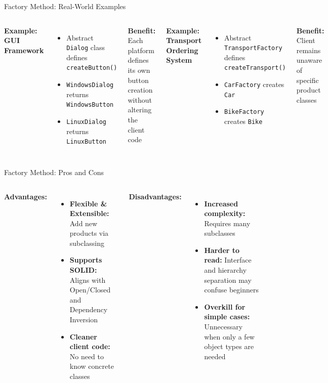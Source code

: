 \documentclass[aspectratio=169, table]{beamer}
\begin{document}
\begin{frame}[fragile]{Factory Method: Real-World Examples}
\vspace{10pt}
\begin{columns}[T]
\textbf{Example: GUI Framework}
\begin{itemize}
\item Abstract \texttt{Dialog} class defines \texttt{createButton()}
\item \texttt{WindowsDialog} returns \texttt{WindowsButton}
\item \texttt{LinuxDialog} returns \texttt{LinuxButton}
\end{itemize}

\textbf{Benefit:}
Each platform defines its own button creation without altering the client code

\textbf{Example: Transport Ordering System}
\begin{itemize}
\item Abstract \texttt{TransportFactory} defines \texttt{createTransport()}
\item \texttt{CarFactory} creates \texttt{Car}
\item \texttt{BikeFactory} creates \texttt{Bike}
\end{itemize}

\textbf{Benefit:}
Client remains unaware of specific product classes
\end{columns}
\end{frame}

\begin{frame}[fragile]{Factory Method: Pros and Cons}
\vspace{10pt}
\begin{columns}[T]
\textbf{Advantages:}
\begin{itemize}
\item \textbf{Flexible \& Extensible:} Add new products via subclassing
\item \textbf{Supports SOLID:} Aligns with Open/Closed and Dependency Inversion
\item \textbf{Cleaner client code:} No need to know concrete classes
\end{itemize}

\textbf{Disadvantages:}
\begin{itemize}
\item \textbf{Increased complexity:} Requires many subclasses
\item \textbf{Harder to read:} Interface and hierarchy separation may confuse beginners
\item \textbf{Overkill for simple cases:} Unnecessary when only a few object types are needed
\end{itemize}
\end{columns}
\end{frame}
\end{document}
